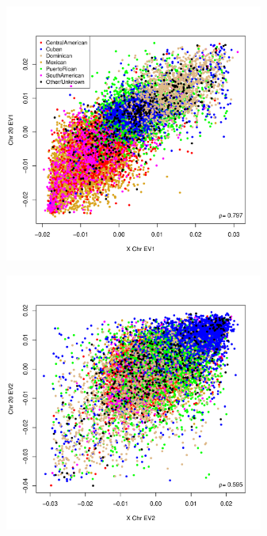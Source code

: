 \documentclass{beamer}
\begin{document}
\begin{frame}
\centering
\begin{figure}
\includegraphics[height=8.5cm]{../pca_chr20_x_ev1_col.pdf}
\end{figure}
\end{frame}

\begin{frame}
\centering
\begin{figure}
\includegraphics[height=8.5cm]{../pca_chr20_x_ev2_col.pdf}
\end{figure}
\end{frame}
\end{document}
